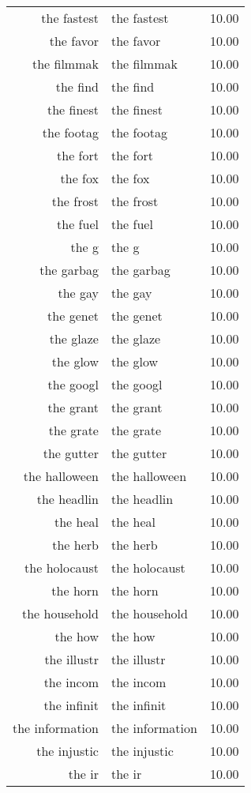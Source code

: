 \begin{table}[ht]
\begin{tabular}{rlr}
  the fastest & the fastest & 10.00 \\ 
  the favor & the favor & 10.00 \\ 
  the filmmak & the filmmak & 10.00 \\ 
  the find & the find & 10.00 \\ 
  the finest & the finest & 10.00 \\ 
  the footag & the footag & 10.00 \\ 
  the fort & the fort & 10.00 \\ 
  the fox & the fox & 10.00 \\ 
  the frost & the frost & 10.00 \\ 
  the fuel & the fuel & 10.00 \\ 
  the g & the g & 10.00 \\ 
  the garbag & the garbag & 10.00 \\ 
  the gay & the gay & 10.00 \\ 
  the genet & the genet & 10.00 \\ 
  the glaze & the glaze & 10.00 \\ 
  the glow & the glow & 10.00 \\ 
  the googl & the googl & 10.00 \\ 
  the grant & the grant & 10.00 \\ 
  the grate & the grate & 10.00 \\ 
  the gutter & the gutter & 10.00 \\ 
  the halloween & the halloween & 10.00 \\ 
  the headlin & the headlin & 10.00 \\ 
  the heal & the heal & 10.00 \\ 
  the herb & the herb & 10.00 \\ 
  the holocaust & the holocaust & 10.00 \\ 
  the horn & the horn & 10.00 \\ 
  the household & the household & 10.00 \\ 
  the how & the how & 10.00 \\ 
  the illustr & the illustr & 10.00 \\ 
  the incom & the incom & 10.00 \\ 
  the infinit & the infinit & 10.00 \\ 
  the information & the information & 10.00 \\ 
  the injustic & the injustic & 10.00 \\ 
  the ir & the ir & 10.00 \\ 

\end{tabular}
\end{table}
